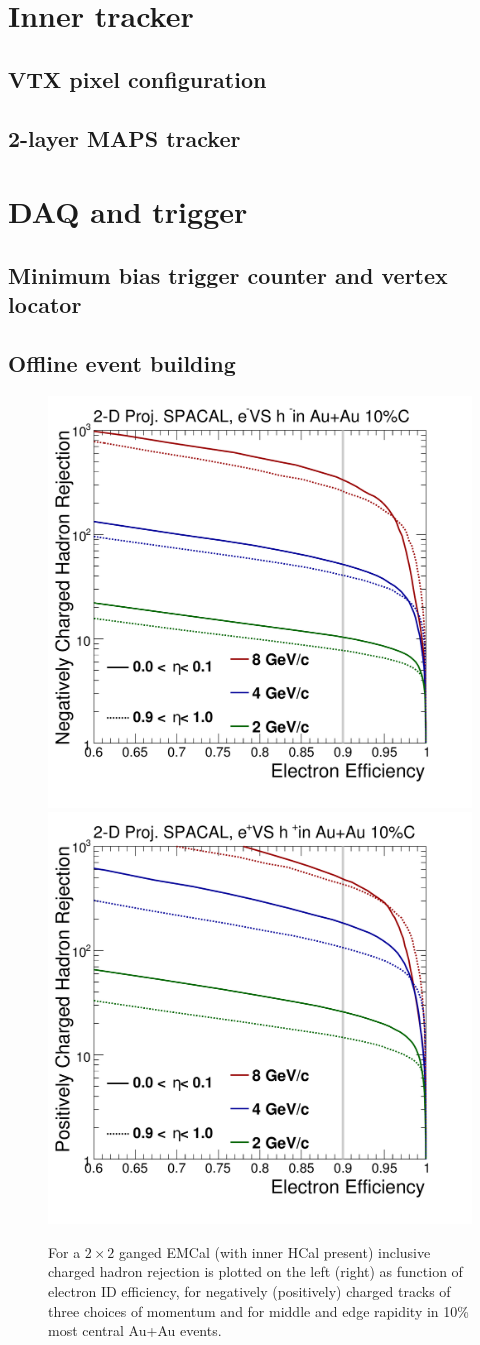 \section{Inner tracker}
\label{sec:innertracker}
\subsection{VTX pixel configuration}
\subsection{2-layer MAPS tracker}
\section{DAQ and trigger}
\subsection{Minimum bias trigger counter and vertex locator}
\subsection{Offline event building}


\begin{figure}[hbt]
  \centering
  \includegraphics[width=0.4\linewidth]{figs/DrawEcal_Likelihood_Sum_RejectionCurve_AuAuSummary}
  \hspace{0.1\linewidth}
  \includegraphics[width=0.4\linewidth]{figs/DrawEcal_Likelihood_Sum_RejectionCurve_AuAuSummaryPos}
  \caption{For a $2\times2$ ganged EMCal (with inner HCal present)
    inclusive charged hadron rejection is plotted on the left (right)
    as function of electron ID efficiency, for negatively (positively)
    charged tracks of three choices of momentum and for middle and
    edge rapidity in 10\% most central Au+Au events.}
  \label{fig:eid_auau}
\end{figure}


